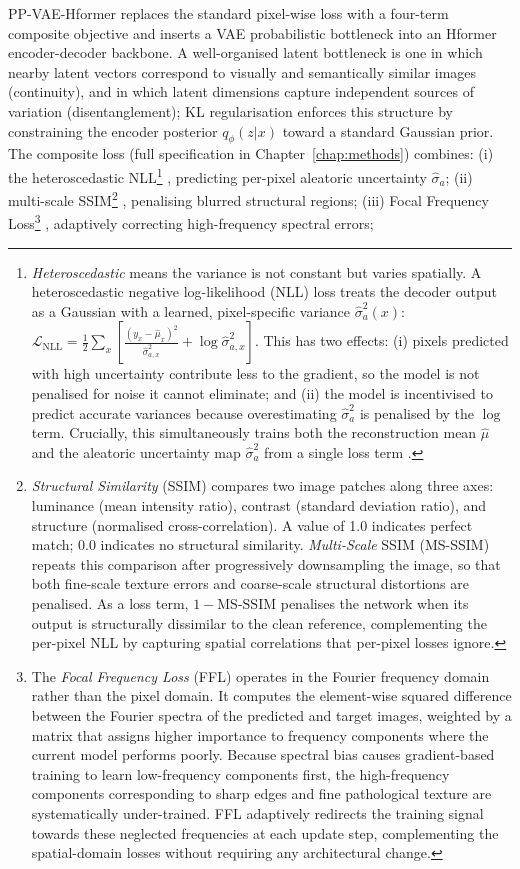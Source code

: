 \documentclass[12pt, a4paper, twoside, openright]{book}
\begin{document}
PP-VAE-Hformer replaces the standard pixel-wise loss with a four-term composite objective and inserts a VAE probabilistic bottleneck into an Hformer encoder-decoder backbone. A well-organised latent bottleneck is one in which nearby latent vectors correspond to visually and semantically similar images (continuity), and in which latent dimensions capture independent sources of variation (disentanglement); KL regularisation enforces this structure by constraining the encoder posterior $q_\phi(z|x)$ toward a standard Gaussian prior. The composite loss (full specification in Chapter~\ref{chap:methods}) combines: (i) the heteroscedastic NLL\footnote{\emph{Heteroscedastic} means the variance is not constant but varies spatially. A heteroscedastic negative log-likelihood (NLL) loss treats the decoder output as a Gaussian with a learned, pixel-specific variance $\hat{\sigma}^2_a(x)$: $\mathcal{L}_\mathrm{NLL} = \frac{1}{2}\sum_x \left[\frac{(y_x - \hat{\mu}_x)^2}{\hat{\sigma}^2_{a,x}} + \log\hat{\sigma}^2_{a,x}\right]$. This has two effects: (i) pixels predicted with high uncertainty contribute less to the gradient, so the model is not penalised for noise it cannot eliminate; and (ii) the model is incentivised to predict accurate variances because overestimating $\hat{\sigma}^2_a$ is penalised by the $\log$ term. Crucially, this simultaneously trains both the reconstruction mean $\hat{\mu}$ and the aleatoric uncertainty map $\hat{\sigma}^2_a$ from a single loss term \cite{kendall_what_2017}.} \cite{kendall_what_2017}, predicting per-pixel aleatoric uncertainty $\hat{\sigma}_a$; (ii) multi-scale SSIM\footnote{\emph{Structural Similarity} (SSIM) \cite{wang_image_2004} compares two image patches along three axes: luminance (mean intensity ratio), contrast (standard deviation ratio), and structure (normalised cross-correlation). A value of 1.0 indicates perfect match; 0.0 indicates no structural similarity. \emph{Multi-Scale} SSIM (MS-SSIM) \cite{wang_multiscale_2003} repeats this comparison after progressively downsampling the image, so that both fine-scale texture errors and coarse-scale structural distortions are penalised. As a loss term, $1 - \mathrm{MS\text{-}SSIM}$ penalises the network when its output is structurally dissimilar to the clean reference, complementing the per-pixel NLL by capturing spatial correlations that per-pixel losses ignore.} \cite{wang_multiscale_2003}, penalising blurred structural regions; (iii) Focal Frequency Loss\footnote{The \emph{Focal Frequency Loss} (FFL) \cite{jiang_focal_2021} operates in the Fourier frequency domain rather than the pixel domain. It computes the element-wise squared difference between the Fourier spectra of the predicted and target images, weighted by a matrix that assigns higher importance to frequency components where the current model performs poorly. Because spectral bias causes gradient-based training to learn low-frequency components first, the high-frequency components corresponding to sharp edges and fine pathological texture are systematically under-trained. FFL adaptively redirects the training signal towards these neglected frequencies at each update step, complementing the spatial-domain losses without requiring any architectural change.} \cite{jiang_focal_2021}, adaptively correcting high-frequency spectral errors; 
\end{document}
